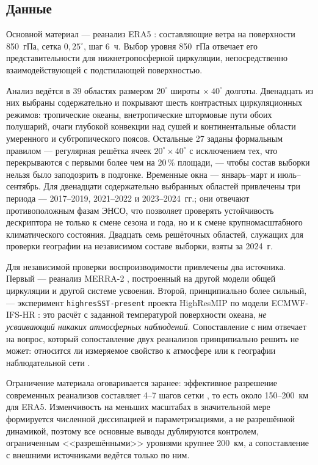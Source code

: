\documentclass[11pt,a4paper]{article}
\begin{document}
\subsection{Данные}

Основной материал --- реанализ ERA5 \cite{Hersbach2020,Soci2024}: составляющие ветра на поверхности 850~гПа, сетка $0{,}25^\circ$, шаг 6~ч. Выбор уровня 850~гПа отвечает его представительности для нижнетропосферной циркуляции, непосредственно взаимодействующей с подстилающей поверхностью.

Анализ ведётся в 39 областях размером $20^\circ$ широты $\times\ 40^\circ$ долготы. Двенадцать из них выбраны содержательно и покрывают шесть контрастных циркуляционных режимов: тропические океаны, внетропические штормовые пути обоих полушарий, очаги глубокой конвекции над сушей и континентальные области умеренного и субтропического поясов. Остальные 27 заданы формальным правилом --- регулярная решётка ячеек $20^\circ\times40^\circ$ с исключением тех, что перекрываются с первыми более чем на 20\,\% площади, --- чтобы состав выборки нельзя было заподозрить в подгонке. Временные окна --- январь--март и июль--сентябрь. Для двенадцати содержательно выбранных областей привлечены три периода --- 2017--2019, 2021--2022 и 2023--2024~гг.; они отвечают противоположным фазам ЭНСО, что позволяет проверять устойчивость дескриптора не только к смене сезона и года, но и к смене крупномасштабного климатического состояния. Двадцать семь решёточных областей, служащих для проверки географии на независимом составе выборки, взяты за 2024~г.

Для независимой проверки воспроизводимости привлечены два источника. Первый --- реанализ MERRA-2 \cite{Gelaro2017}, построенный на другой модели общей циркуляции и другой системе усвоения. Второй, принципиально более сильный, --- эксперимент \texttt{highresSST-present} проекта HighResMIP \cite{Haarsma2016} по модели ECMWF-IFS-HR \cite{Roberts2018}: это расчёт с заданной температурой поверхности океана, \emph{не усваивающий никаких атмосферных наблюдений}. Сопоставление с ним отвечает на вопрос, который сопоставление двух реанализов принципиально решить не может: относится ли измеряемое свойство к атмосфере или к географии наблюдательной сети \cite{BonavitaLaloyaux2020}.

Ограничение материала оговаривается заранее: эффективное разрешение современных реанализов составляет 4--7 шагов сетки \cite{Skamarock2004,Bolgiani2022}, то есть около 150--200~км для ERA5. Изменчивость на меньших масштабах в значительной мере формируется численной диссипацией и параметризациями, а не разрешённой динамикой, поэтому все основные выводы дублируются контролем, ограниченным <<разрешёнными>> уровнями крупнее 200~км, а сопоставление с внешними источниками ведётся только по ним.
\end{document}
